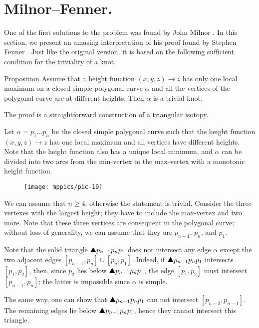 \section{Milnor--Fenner.}

One of the first solutions to the problem was found by John Milnor \cite{milnor}.
In this section, we present an amusing interpretation of his proof found by Stephen Fenner \cite{ferner}.
Just like the original version, it is based on the following sufficient condition for the triviality of a knot.

\begin{thm}{Proposition}\label{prop:one-max-one-min}
Assume that a height function $(x,y,z)\to z$ 
has only one local maximum on a closed simple polygonal curve $\alpha$ and all the vertices of the polygonal curve are at different heights.
Then $\alpha$ is a trivial knot.
\end{thm}

The proof is a straightforward construction of a triangular isotopy. 

Let $\alpha=p_1\dots p_n$ be the closed simple polygonal curve such that the height function $(x,y,z)\to z$ has one local maximum and all vertices have different heights.
Note that the height function also has a unique local minimum, and $\alpha$ can be divided into two arcs from the min-vertex to the max-vertex with a monotonic height function.

{

\begin{wrapfigure}{r}{30 mm}
\vskip-0mm
\centering
\texttt{[image: mppics/pic-19]}
\vskip0mm
\end{wrapfigure}

We can assume that $n\ge 4$; otherwise the statement is trivial.
Consider the three vertexes with the largest height;
they have to include the max-vertex and two more.
Note that these three vertices are consequent in the polygonal curve; 
without loss of generality, we can assume that they are $p_{n-1}$, $p_n$, and $p_1$.

Note that the solid triangle $\solidtriangle p_{n-1}p_np_1$ does not intersect any edge $\alpha$ except the two adjacent edges $[p_{n-1},p_n]\cup[p_n,p_1]$.
Indeed, if $\solidtriangle p_{n-1}p_np_1$ intersects $[p_1,p_2]$,
then, 
since $p_2$ lies below $\solidtriangle p_{n-1}p_np_1$,
the edge $[p_1,p_2]$ must intersect $[p_{n-1},p_n]$;
the latter is impossible since $\alpha$ is simple.

}

The same way, one can show that $\solidtriangle p_{n-1}p_np_1$ can not intersect $[p_{n-2},p_{n-1}]$.
The remaining edges lie below $\solidtriangle p_{n-1}p_np_1$, hence they cannot intersect this triangle.

